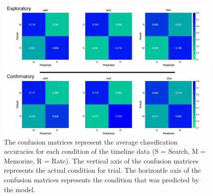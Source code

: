 \documentclass[
  english,
  man,floatsintext]{apa6}
\begin{document}
\begin{appendix}
\begin{figure}
\centering
\includegraphics{supplementary_analysis/confusion_matrices/supp_conf_matrices.pdf}
\caption{\label{fig:supp-conf-matrices}The confusion matrices represent the
average classification accuracies for each condition of the timeline
data (S = Search, M = Memorize, R = Rate). The vertical axis of the
confusion matrices represents the actual condition for trial. The
horizontle axis of the confusion matrices represents the condition that
was predicted by the model.}
\end{figure}
\end{appendix}
\end{document}
